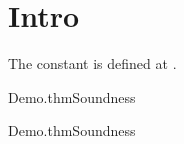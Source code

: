 \documentclass{article}
\begin{document}
\section{Intro}
The constant  is defined at .
\begin{leanblock}[view=lean]{Demo.thm}{Soundness}
\end{leanblock}
\begin{leantheorem}{Demo.thm}{Soundness}
\end{leantheorem}



\end{document}
